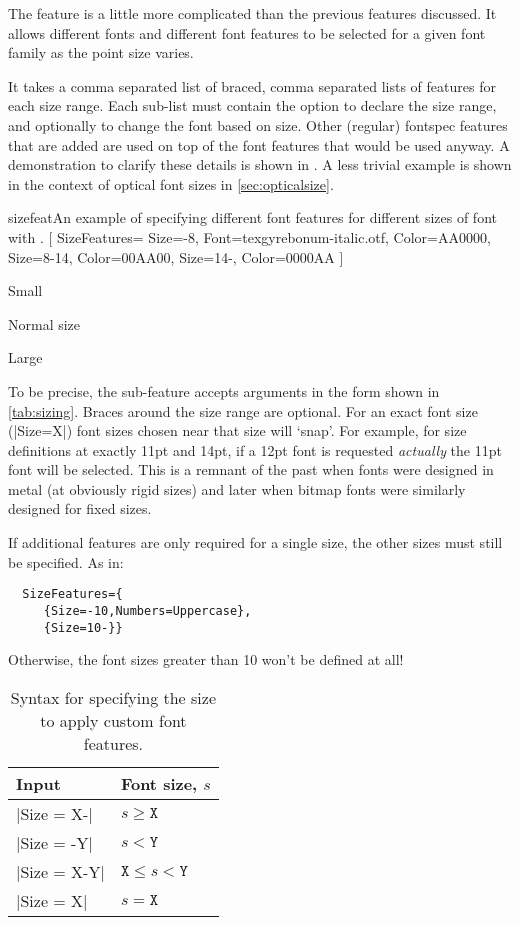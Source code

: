 The  feature is a little more complicated
than the previous features discussed. It allows different fonts
and different font features to be selected for a given font
family as the point size varies.

It takes a comma separated list of braced, comma separated lists of features for each size range.
Each sub-list must contain the  option
to declare the size range, and optionally  to change the
font based on size. Other (regular) fontspec features that are added
are used on top of the font features that would be used anyway.
A demonstration to clarify these details is shown in .
A less trivial example is shown in the context of optical font sizes
in \vref{sec:opticalsize}.

\begin{Xexample}{sizefeat}{An example of specifying different font features for different sizes of font with .}
  [
    SizeFeatures={
      {Size={-8}, Font=texgyrebonum-italic.otf, Color=AA0000},
      {Size={8-14}, Color=00AA00},
      {Size={14-}, Color=0000AA}} ]

  {\scriptsize Small\par} Normal size\par {\Large Large\par}
\end{Xexample}

To be precise, the  sub-feature accepts arguments in the form shown in \vref{tab:sizing}.
Braces around the size range are optional. For an exact font size (|Size=X|)
font sizes chosen near that size will `snap'. For example, for size definitions
at exactly 11pt and 14pt, if a 12pt font is requested \emph{actually} the
11pt font will be selected. This is a remnant of the past when fonts were designed
in metal (at obviously rigid sizes) and later when bitmap fonts were similarly
designed for fixed sizes.

If additional features are only required for a single size, the other sizes
must still be specified.  As in:
\begin{Verbatim}
  SizeFeatures={
     {Size=-10,Numbers=Uppercase},
     {Size=10-}}
\end{Verbatim}
Otherwise, the font sizes greater than 10 won't be defined at all!

\begin{table}
\caption{Syntax for specifying the size to apply custom font features.}\label{tab:sizing}
\centering
\begin{tabular}{@{}ll@{}}
\toprule
Input & Font size, $s$ \\
\midrule
 |Size = X-| & $s \geq \texttt{X}$ \\
 |Size = -Y| & $s < \texttt{Y}$ \\
 |Size = X-Y| & $\texttt{X} \leq s < \texttt{Y}$ \\
 |Size = X| & $s = \texttt{X}$ \\
\bottomrule
\end{tabular}
\end{table}

